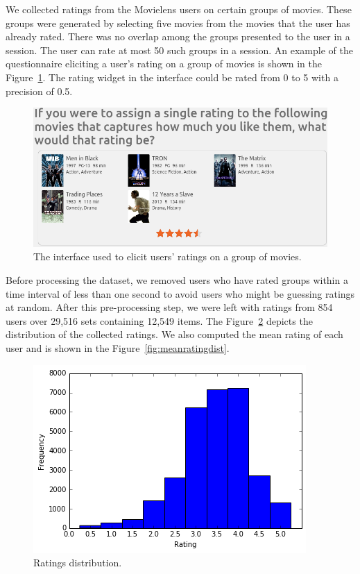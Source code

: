 
We collected ratings from the Movielens users on certain groups of movies. These
groups were generated by selecting five movies from the movies that the user has
already rated. There was no overlap among the groups presented to the user in a
session. The user can rate at most 50 such groups in a session. An example of
the questionnaire eliciting a user's rating on a group of movies is shown in the
Figure~\ref{fig:mlset}. The rating widget in the interface could be rated from 0 to 5 with a
precision of 0.5.

\begin{figure}[ht]
  \includegraphics[scale=0.30]{figures/mlset.png}
  \caption{The interface used to elicit users' ratings on a group of movies.}
  \label{fig:mlset}
\end{figure}


Before processing the dataset, we removed users who have rated groups within a
time interval of less than one second to avoid users who might be guessing
ratings at random. After this pre-processing step, we were left with ratings
from 854 users over 29,516  sets containing 12,549 items. The
Figure~\ref{fig:setratingdist} depicts
the distribution of the collected ratings. We also computed the mean rating of
each user and is shown in the Figure~\ref{fig:meanratingdist}.  

\begin{figure}[ht]
  \includegraphics[scale=0.65]{figures/setratingdist.png}
  \caption{Ratings distribution.}
  \label{fig:setratingdist}
\end{figure}

